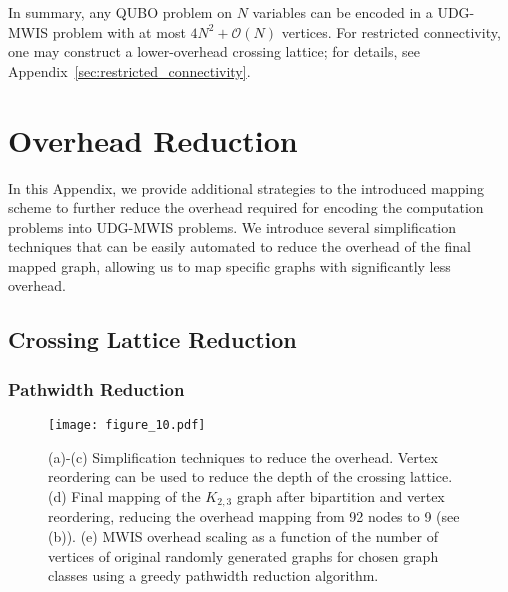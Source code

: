 In summary, any QUBO problem on $N$ variables can be encoded in a UDG-MWIS problem with at most $4N^2+\mathcal{O}(N)$ vertices. For restricted connectivity, one may construct a lower-overhead crossing lattice; for details, see Appendix~\ref{sec:restricted_connectivity}.


\appendix

\section{Overhead Reduction}
\label{sec:overhead_reduction}

In this Appendix, we provide additional strategies to the introduced mapping scheme to further reduce the overhead required for encoding the computation problems into UDG-MWIS problems.
We introduce several simplification techniques that can be easily automated to reduce the overhead of the final mapped graph, allowing us to map specific graphs with significantly less overhead.

\subsection{Crossing Lattice Reduction}

\subsubsection{Pathwidth Reduction}

\begin{figure}[b]
\centering
 \texttt{[image: figure\_10.pdf]}
\caption{(a)-(c) Simplification techniques to reduce the overhead. Vertex reordering can be used to reduce the depth of the crossing lattice. (d) Final mapping of the $K_{2,3}$ graph after bipartition and vertex reordering, reducing the overhead mapping from 92 nodes to 9 (see (b)). (e) MWIS overhead scaling as a function of the number of vertices of original randomly generated graphs for chosen graph classes using a greedy pathwidth reduction algorithm.}
 \label{fig:simplificationK23}
\end{figure}

